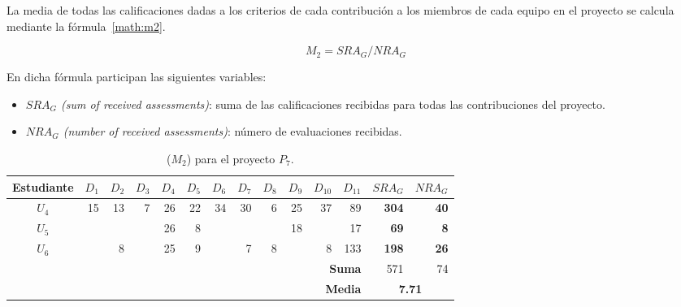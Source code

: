 La media de todas las calificaciones dadas a los criterios de cada contribución a los miembros de cada equipo en el proyecto se calcula mediante la fórmula~\ref{math:m2}.

\begin{equation}
    \textbf{$M_2 = SRA_G/NRA_G$}
    \label{math:m2}
\end{equation}

En dicha fórmula participan las siguientes variables:
\begin{itemize}	
	\item \emph{$SRA_G$ (sum of received assessments)}: suma de las calificaciones recibidas para todas las contribuciones del proyecto.
	\item \emph{$NRA_G$ (number of received assessments)}: número de evaluaciones recibidas.
\end{itemize} 

\begin{table}[h]
\centering
\begin{tabular}{|c|r|r|r|r|r|r|r|r|r|r|r|r|r|}
\hline
\textbf{Estudiante} & \textbf{$D_1$} & \textbf{$D_2$} & \textbf{$D_3$} & \textbf{$D_4$} & \textbf{$D_5$} & \textbf{$D_6$} & \textbf{$D_7$} & \textbf{$D_8$} & \textbf{$D_9$} & \textbf{$D_{10}$} & \textbf{$D_{11}$} &  \textbf{$SRA_G$ } & \textbf{$NRA_G$ } \\ \hline
\hline
$U_4$ & 15  & 13  & 7  & 26 & 22 & 34  & 30 & 6   & 25  & 37 & 89  & \textbf{304} & \textbf{40} \\ \hline
$U_5$ &      &      &     & 26 & 8   &      &      &      &  18 &      & 17 &  \textbf{69}  & \textbf{8} \\ \hline
$U_6$ &     &  8    &    &  25 & 9  &     &   7   &  8   &      &  8  &  133 & \textbf{198} & \textbf{26} \\ \hline
\hline
\hline
\multicolumn{12}{|r|}{\textbf{Suma}} & 571 &  74 \\ \hline
\multicolumn{12}{|r|}{\textbf{Media}} & \multicolumn{2}{|c|}{\textbf{7.71}} \\ \hline
\end{tabular}
\caption{($M_2$) para el proyecto $P_{7}$.}
\label{table:7-project-peers-grades}
\end{table}

